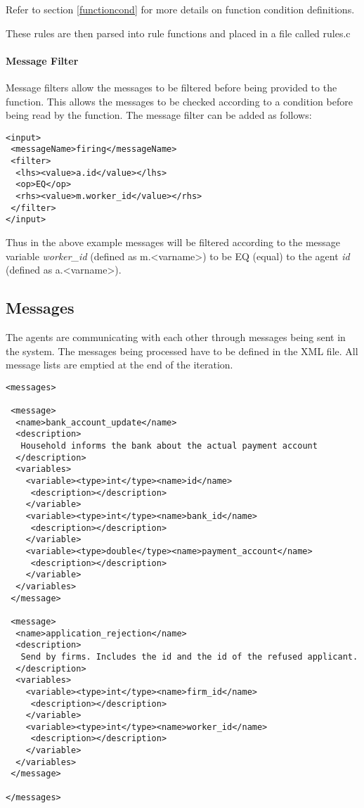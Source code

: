 Refer to section \ref{functioncond} for more details on function
condition definitions.

These rules are then parsed into rule functions and placed in a file
called rules.c

\paragraph{Message Filter}
Message filters allow the messages to be filtered before being
provided to the function. This allows the messages to be checked
according to a condition before being read by the function. The
message filter can be added as follows:

\begin{mylisting}
\begin{verbatim}
<input>
 <messageName>firing</messageName>
 <filter>
  <lhs><value>a.id</value></lhs>
  <op>EQ</op>
  <rhs><value>m.worker_id</value></rhs>
 </filter>
</input>
\end{verbatim}
\end{mylisting}

Thus in the above example messages will be filtered according to the
message variable \emph{worker\_id} (defined as m.<varname>) to be EQ
(equal) to the agent \emph{id} (defined as a.<varname>).

\subsection{Messages}

The agents are communicating with each other through messages being
sent in the system. The messages being processed have to be defined
in the XML file. All message lists are emptied at the end of the
iteration.

\begin{mylisting}
\begin{verbatim}
<messages>

 <message>
  <name>bank_account_update</name>
  <description>
   Household informs the bank about the actual payment account
  </description>
  <variables>
    <variable><type>int</type><name>id</name>
     <description></description>
    </variable>
    <variable><type>int</type><name>bank_id</name>
     <description></description>
    </variable>
    <variable><type>double</type><name>payment_account</name>
     <description></description>
    </variable>
  </variables>
 </message>

 <message>
  <name>application_rejection</name>
  <description>
   Send by firms. Includes the id and the id of the refused applicant.
  </description>
  <variables>
    <variable><type>int</type><name>firm_id</name>
     <description></description>
    </variable>
    <variable><type>int</type><name>worker_id</name>
     <description></description>
    </variable>
  </variables>
 </message>

</messages>
\end{verbatim}
\end{mylisting}
